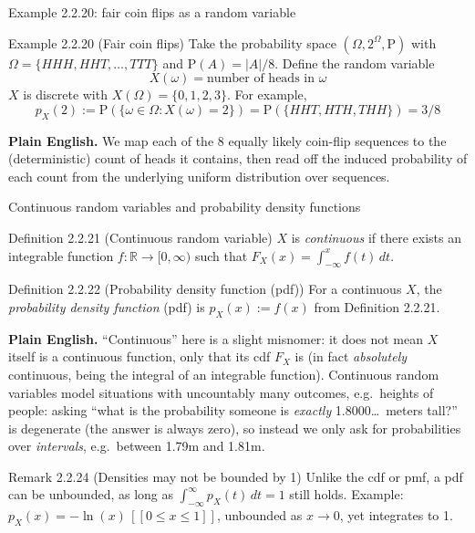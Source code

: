 \documentclass[aspectratio=169,10pt]{beamer}
\begin{document}
\begin{frame}{Example 2.2.20: fair coin flips as a random variable}
\begin{block}{Example 2.2.20 (Fair coin flips)}
Take the probability space $(\Omega,2^{\Omega},\mathrm{P})$ with
$\Omega=\{HHH,HHT,\ldots,TTT\}$ and $\mathrm{P}(A)=|A|/8$. Define the random
variable
\[ X(\omega) = \text{number of heads in } \omega \]
$X$ is discrete with $X(\Omega)=\{0,1,2,3\}$. For example,
\[ p_X(2) := \mathrm{P}(\{\omega\in\Omega : X(\omega)=2\}) = \mathrm{P}(\{HHT,HTH,THH\}) = 3/8 \]
\end{block}
\textbf{Plain English.} We map each of the 8 equally likely coin-flip
sequences to the (deterministic) count of heads it contains, then read off
the induced probability of each count from the underlying uniform
distribution over sequences.
\end{frame}

\begin{frame}{Continuous random variables and probability density functions}
\begin{block}{Definition 2.2.21 (Continuous random variable)}
$X$ is \emph{continuous} if there exists an integrable function
$f:\mathbb{R}\to[0,\infty)$ such that $F_X(x)=\int_{-\infty}^{x}f(t)\,dt$.
\end{block}
\begin{block}{Definition 2.2.22 (Probability density function (pdf))}
For a continuous $X$, the \emph{probability density function} (pdf) is
$p_X(x) := f(x)$ from Definition 2.2.21.
\end{block}
\textbf{Plain English.} ``Continuous'' here is a slight misnomer: it does not
mean $X$ itself is a continuous function, only that its cdf $F_X$ is (in
fact \emph{absolutely} continuous, being the integral of an integrable
function). Continuous random variables model situations with uncountably
many outcomes, e.g.\ heights of people: asking ``what is the probability
someone is \emph{exactly} 1.8000\ldots\ meters tall?'' is degenerate (the
answer is always zero), so instead we only ask for probabilities over
\emph{intervals}, e.g.\ between 1.79m and 1.81m.

\begin{block}{Remark 2.2.24 (Densities may not be bounded by 1)}
Unlike the cdf or pmf, a pdf can be unbounded, as long as $\int_{-\infty}^{\infty}p_X(t)\,dt=1$
still holds. Example: $p_X(x)=-\ln(x)\,[\![0\leq x\leq 1]\!]$, unbounded as $x\to 0$, yet integrates to 1.
\end{block}
\end{frame}
\end{document}
